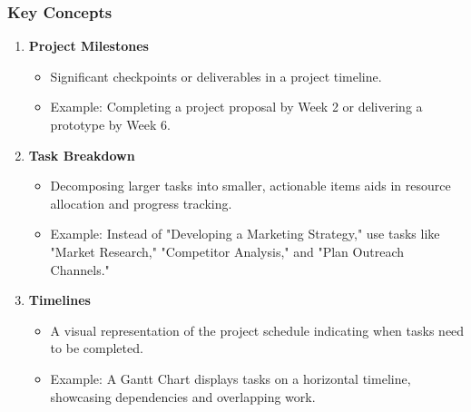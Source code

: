 \documentclass[aspectratio=169]{beamer}
\begin{document}
\begin{frame}[fragile]
  \frametitle{Key Concepts}
  \begin{enumerate}
    \item \textbf{Project Milestones}
      \begin{itemize}
        \item Significant checkpoints or deliverables in a project timeline.
        \item Example: Completing a project proposal by Week 2 or delivering a prototype by Week 6.
      \end{itemize}
      
    \item \textbf{Task Breakdown}
      \begin{itemize}
        \item Decomposing larger tasks into smaller, actionable items aids in resource allocation and progress tracking.
        \item Example: Instead of "Developing a Marketing Strategy," use tasks like "Market Research," "Competitor Analysis," and "Plan Outreach Channels."
      \end{itemize}
      
    \item \textbf{Timelines}
      \begin{itemize}
        \item A visual representation of the project schedule indicating when tasks need to be completed.
        \item Example: A Gantt Chart displays tasks on a horizontal timeline, showcasing dependencies and overlapping work.
      \end{itemize}
  \end{enumerate}
\end{frame}
\end{document}
